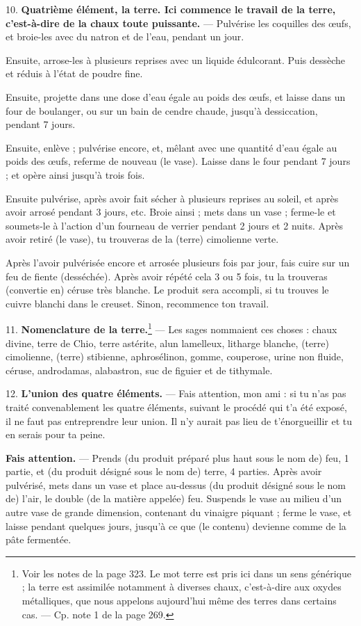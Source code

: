 \documentclass[a4paper, 11pt, oneside, polutonikogreek, french]{article}
\begin{document}
10. \textbf{Quatrième élément, la terre. Ici commence le travail de la terre, c'est-à-dire de la chaux toute puissante.} --- Pulvérise les coquilles des œufs, et broie-les avec du natron et de l'eau, pendant un jour.

Ensuite, arrose-les à plusieurs reprises avec un liquide édulcorant. Puis dessèche et réduis à l'état de poudre fine.

Ensuite, projette dans une dose d'eau égale au poids des œufs, et laisse dans un four de boulanger, ou sur un bain de cendre chaude, jusqu'à dessiccation, pendant 7 jours.

Ensuite, enlève ; pulvérise encore, et, mêlant avec une quantité d'eau égale au poids des œufs, referme de nouveau (le vase). Laisse dans le four pendant 7 jours ; et opère ainsi jusqu'à trois fois.

Ensuite pulvérise, après avoir fait sécher à plusieurs reprises au soleil, et après avoir arrosé pendant 3 jours, etc. Broie ainsi ; mets dans un vase ; ferme-le et soumets-le à l'action d'un fourneau de verrier pendant 2 jours et 2 nuits. Après avoir retiré (le vase), tu trouveras de la (terre) cimolienne verte.

Après l'avoir pulvérisée encore et arrosée plusieurs fois par jour, fais cuire sur un feu de fiente (desséchée). Après avoir répété cela 3 ou 5 fois, tu la trouveras (convertie en) céruse très blanche. Le produit sera accompli, si tu trouves le cuivre blanchi dans le creuset. Sinon, recommence ton travail.

11. \textbf{Nomenclature de la terre.}\footnote{Voir les notes de la page 323. Le mot terre est pris ici dans un sens générique ; la terre est assimilée notamment à diverses chaux, c'est-à-dire aux oxydes métalliques, que nous appelons aujourd'hui même des terres dans certains cas. --- Cp. note 1 de la page 269.} --- Les sages nommaient ces choses : chaux divine, terre de Chio, terre astérite, alun lamelleux, litharge blanche, (terre) cimolienne, (terre) stibienne, aphrosélinon, gomme, couperose, urine non fluide, céruse, androdamas, alabastron, suc de figuier et de tithymale.

12. \textbf{L'union des quatre éléments.} --- Fais attention, mon ami : si tu n'as pas traité convenablement les quatre éléments, suivant le procédé qui t'a été exposé, il ne faut pas entreprendre leur union. Il n'y aurait pas lieu de t'énorgueillir et tu en serais pour ta peine.

\textbf{Fais attention.} --- Prends (du produit préparé plus haut sous le nom de) feu, 1 partie, et (du produit désigné sous le nom de) terre, 4 parties. Après avoir pulvérisé, mets dans un vase et place au-dessus (du produit désigné sous le nom de) l'air, le double (de la matière appelée) feu. Suspends le vase au milieu d'un autre vase de grande dimension, contenant du vinaigre piquant ; ferme le vase, et laisse pendant quelques jours, jusqu'à ce que (le contenu) devienne comme de la pâte fermentée.
\end{document}
